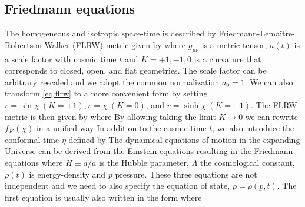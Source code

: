 \subsection{Friedmann equations}
The homogeneous and isotropic space-time is described by Friedmann-Lema\^{i}tre-Robertson-Walker (FLRW) metric given by
where $g_{\mu\nu}$ is a metric tensor, $a(t)$ is a scale factor with cosmic time $t$ and $K=+1,-1,0$ is a curvature that corresponds to closed, open, and flat geometries. The scale factor can be arbitrary rescaled and we adopt the common normalization $a_0=1$. We can also transform \autoref{eq:flrw} to a more convenient form by setting $r=\sin\chi\ (K=+1),r=\chi\ (K=0)$, and $r=\sinh\chi\ (K=-1)$. The FLRW metric is then given by
where
By allowing taking the limit $K\to0$ we can rewrite $f_K(\chi)$ in a unified way
In addition to the cosmic time $t$, we also introduce the conformal time $\eta$ defined by
The dynamical equations of motion in the expanding Universe can be derived from the Einstein equations resulting in the Friedmann equations
where $H\equiv\dot a/a$ is the Hubble parameter, $\Lambda$ the cosmological constant, $\rho(t)$ is energy-density and $p$ pressure. These three equations are not independent and we need to also specify the equation of state, $\rho=\rho(p,t)$. The first equation is usually also written in the form
where

